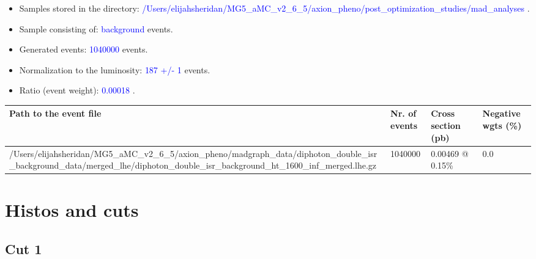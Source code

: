 \documentclass[a4paper, 10pt]{article}
\begin{document}
\begin{itemize}
  \item Samples stored in the directory: \textcolor{blue}{/\-Users/\-elijahsheridan/\-MG5\_aMC\_v2\_6\_5/\-axion\_pheno/\-post\_optimization\_studies/\-mad\_analyses} .
   \item Sample consisting of: \textcolor{blue}{background}  events.
   \item Generated events: \textcolor{blue}{1040000 }  events.
   \item Normalization to the luminosity: \textcolor{blue}{187}\textcolor{blue}{ +/\-- }\textcolor{blue}{1 }  events.
   \item Ratio (event weight): \textcolor{blue}{0.00018 } .  
 
\end{itemize}
\begin{table}[H]
  \begin{center}
    \begin{tabular}{|m{55.0mm}|m{25.0mm}|m{30.0mm}|m{30.0mm}|}
      \hline
      {\cellcolor{yellow}         Path to the event file}& {\cellcolor{yellow}         Nr. of events}& {\cellcolor{yellow}         Cross section (pb)}& {\cellcolor{yellow}         Negative wgts (\%)}\\
      \hline
      {\cellcolor{white}          /\-Users/\-elijahsheridan/\-MG5\_aMC\_v2\_6\_5/\-axion\_pheno/\-madgraph\_data/\-diphoton\_double\_isr\_background\_data/\-merged\_lhe/\-diphoton\_double\_isr\_background\_ht\_1600\_inf\_merged.lhe.gz}& {\cellcolor{white}          1040000}& {\cellcolor{white}          0.00469 @ 0.15\%}& {\cellcolor{white}          0.0}\\
\hline
    \end{tabular}
  \end{center}
\end{table}

\newpage
\section{ Histos and cuts}

\subsection{Cut 1}
\end{document}
